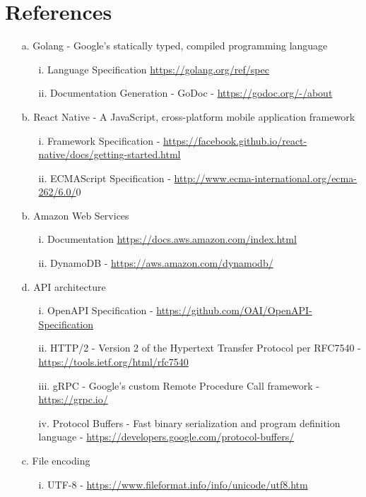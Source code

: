 \documentclass{scrreprt}
\begin{document}
\section{References}
\begin{enumerate}
\item[a.] Golang - Google's statically typed, compiled programming language
	\begin{itemize}
		\item[i.] Language Specification \url{https://golang.org/ref/spec}
		\item[ii.] Documentation Generation - GoDoc - \url{https://godoc.org/-/about}
	\end{itemize}
\item[b.] React Native - A JavaScript, cross-platform mobile application framework 
	\begin{itemize}
		\item[i.] Framework Specification - \url{https://facebook.github.io/react-native/docs/getting-started.html}
		\item[ii.] ECMAScript Specification - \url{http://www.ecma-international.org/ecma-262/6.0/}0
	\end{itemize}
\item[b.] Amazon Web Services
	\begin{itemize}
		\item[i.] Documentation \url{https://docs.aws.amazon.com/index.html}
		\item[ii.] DynamoDB - \url{https://aws.amazon.com/dynamodb/}
	\end{itemize}
\item[d.] API architecture
	\begin{itemize}
		\item[i.] OpenAPI Specification - \url{https://github.com/OAI/OpenAPI-Specification}
		\item[ii.] HTTP/2 - Version 2 of the Hypertext Transfer Protocol per RFC7540 - \url{https://tools.ietf.org/html/rfc7540}
		\item[iii.] gRPC - Google's custom Remote Procedure Call framework - \url{https://grpc.io/}
		\item[iv.] Protocol Buffers - Fast binary serialization and program definition language - \url{https://developers.google.com/protocol-buffers/}
	\end{itemize}
\item[c.] File encoding
	\begin{itemize}
		\item[i.] UTF-8 - \url{https://www.fileformat.info/info/unicode/utf8.htm}
	\end{itemize}
\end{enumerate}
\end{document}
